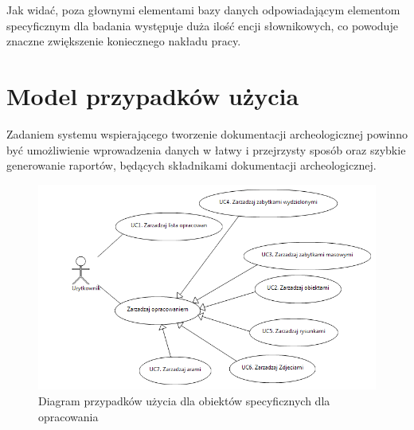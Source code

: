 Jak widać, poza głownymi elementami bazy danych odpowiadającym elementom specyficznym dla badania występuje duża ilość encji słownikowych, co powoduje znaczne zwiększenie koniecznego nakładu pracy. 
\newpage
\section{Model przypadków użycia}
Zadaniem systemu wspierającego tworzenie dokumentacji archeologicznej powinno być umożliwienie wprowadzenia danych w łatwy i przejrzysty sposób oraz szybkie generowanie raportów, będących składnikami dokumentacji archeologicznej.

\begin{figure} [H]
    \begin{center}
	\includegraphics[scale=.5]{img/useCaseZarzadzanieOpracowaniem.png}
	\caption{Diagram przypadków użycia dla obiektów specyficznych dla opracowania}
	\label{useCasesDiag1}
    \end{center}
\end{figure}


